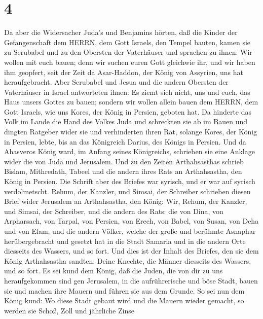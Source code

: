 \hypertarget{section-3}{%
\section{4}\label{section-3}}

 Da aber die Widersacher Juda's und Benjamins hörten, daß
die Kinder der Gefangenschaft dem HERRN, dem Gott Israels, den Tempel
bauten,  kamen sie zu Serubabel und zu den Obersten der
Vaterhäuser und sprachen zu ihnen: Wir wollen mit euch bauen; denn wir
suchen euren Gott gleichwie ihr, und wir haben ihm geopfert, seit der
Zeit da Asar-Haddon, der König von Assyrien, uns hat heraufgebracht.
 Aber Serubabel und Jesua und die andern Obersten der
Vaterhäuser in Israel antworteten ihnen: Es ziemt sich nicht, uns und
euch, das Haus unsers Gottes zu bauen; sondern wir wollen allein bauen
dem HERRN, dem Gott Israels, wie uns Kores, der König in Persien,
geboten hat.  Da hinderte das Volk im Lande die Hand des
Volkes Juda und schreckten sie ab im Bauen  und dingten
Ratgeber wider sie und verhinderten ihren Rat, solange Kores, der König
in Persien, lebte, bis an das Königreich Darius, des Königs in Persien.
 Und da Ahasveros König ward, im Anfang seines Königreichs,
schrieben sie eine Anklage wider die von Juda und Jerusalem.
 Und zu den Zeiten Arthahsasthas schrieb Bislam, Mithredath,
Tabeel und die andern ihres Rats an Arthahsastha, den König in Persien.
Die Schrift aber des Briefes war syrisch, und er war auf syrisch
verdolmetscht.  Rehum, der Kanzler, und Simsai, der
Schreiber schrieben diesen Brief wider Jerusalem an Arthahsastha, den
König:  Wir, Rehum, der Kanzler, und Simsai, der Schreiber,
und die andern des Rats: die von Dina, von Arpharsach, von Tarpal, von
Persien, von Erech, von Babel, von Susan, von Deha und von Elam,
 und die andern Völker, welche der große und berühmte
Asnaphar herübergebracht und gesetzt hat in die Stadt Samaria und in die
andern Orte diesseits des Wassers, und so fort.  Und dies
ist der Inhalt des Briefes, den sie dem König Arthahsastha sandten:
Deine Knechte, die Männer diesseits des Wassers, und so fort.
 Es sei kund dem König, daß die Juden, die von dir zu uns
heraufgekommen sind gen Jerusalem, in die aufrührerische und böse Stadt,
bauen sie und machen ihre Mauern und führen sie aus dem Grunde.
 So sei nun dem König kund: Wo diese Stadt gebaut wird und
die Mauern wieder gemacht, so werden sie Schoß, Zoll und jährliche Zinse
